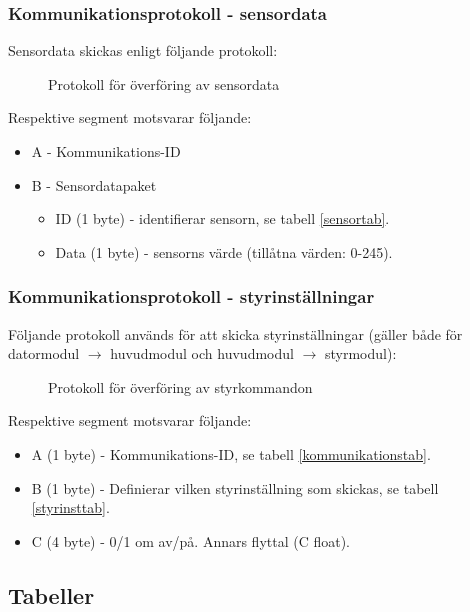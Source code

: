 \documentclass[11pt]{article}
\begin{document}
\begin{flushleft}
\subsubsection{Kommunikationsprotokoll - sensordata}
Sensordata skickas enligt följande protokoll:

 \begin{figure}[H]
\centering
\noindent\resizebox{.8\linewidth}{!}{
	}
	\caption{Protokoll för överföring av sensordata\label{sensordata}}	
\end{figure} 

Respektive segment motsvarar följande: 
\begin{itemize}
	\item A - Kommunikations-ID
	\item B - Sensordatapaket
	\begin{itemize}
	\item ID (1 byte) - identifierar sensorn, se tabell \ref{sensortab}.
	\item Data (1 byte) - sensorns värde (tillåtna värden: 0-245).
	\end{itemize}
\end{itemize}

\subsubsection{Kommunikationsprotokoll - styrinställningar}
Följande protokoll används för att skicka styrinställningar (gäller både för datormodul $\rightarrow$ huvudmodul och huvudmodul $\rightarrow$ styrmodul):

\begin{figure}[htbp]
\centering
\noindent\resizebox{.8\linewidth}{!}{
	}
	\caption{Protokoll för överföring av styrkommandon\label{styrdata}}	
\end{figure}

Respektive segment motsvarar följande: 
\begin{itemize}
	\item A (1 byte) - Kommunikations-ID, se tabell \ref{kommunikationstab}.
	\item B (1 byte) - Definierar vilken styrinställning som skickas, se tabell \ref{styrinsttab}.
	\item C (4 byte) - 0/1 om av/på. Annars flyttal (C float).
\end{itemize}

\subsection{Tabeller}


\end{flushleft}
\end{document}
